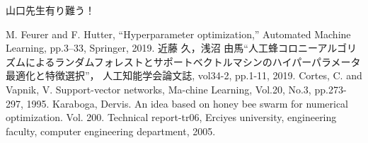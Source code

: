 \documentclass[12pt, dvipdfmx]{jarticle}
\numberwithin{equation}{section}
\begin{document}

\tableofcontents %
\clearpage %

\clearpage %
\clearpage
\clearpage
\clearpage
\clearpage

\clearpage
\clearpage

山口先生有り難う！ %
\clearpage

\begin{thebibliography}{99} %
M. Feurer and F. Hutter, “Hyperparameter optimization,” Automated Machine Learning, pp.3–33, Springer, 2019.
近藤 久，浅沼 由馬“人工蜂コロニーアルゴリズムによるランダムフォレストとサポートベクトルマシンのハイパーパラメータ最適化と特徴選択”，
人工知能学会論文誌, vol34-2, pp.1-11, 2019.
Cortes, C. and Vapnik, V. Support-vector networks, Ma-chine Learning, Vol.20, No.3, pp.273-297, 1995.
Karaboga, Dervis. An idea based on honey bee swarm for numerical optimization. Vol. 200. 
Technical report-tr06, Erciyes university, engineering faculty, computer engineering department, 2005.
\end{thebibliography} %
\end{document}
